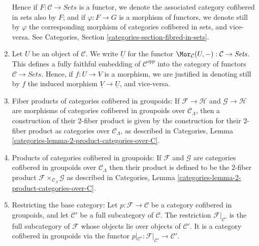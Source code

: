 \begin{remarks}
\begin{enumerate}
Hence if $F : \mathcal{C} \to \textit{Sets}$ is a functor, we denote the
associated category cofibered in sets also by $F$; and if
$\varphi : F \to G$ is a morphism of functors, we denote still by $\varphi$
the corresponding morphism of categories cofibered in sets, and vice-versa.
See Categories, Section \ref{categories-section-fibred-in-sets}.
\item
\label{item-definition-yoneda}
Let $U$ be an object of $\mathcal{C}$.  We write $\underline{U}$ for the
functor
$\Mor_\mathcal{C}(U, -): \mathcal{C} \to
\textit{Sets}$.  This defines a fully faithful embedding of $\mathcal
C^{opp}$ into the category of functors $\mathcal{C} \to
\textit{Sets}$. Hence, if $f : U \to V$ is a morphism, we are
justified in denoting still by $f$ the induced morphism $\underline{V}
\to \underline{U}$, and vice-versa.
\item
\label{item-fibre-product}
Fiber products of categories cofibered in groupoids: If $\mathcal{F}
\to \mathcal{H}$ and $\mathcal{G} \to \mathcal{H}$ are morphisms
of categories cofibered in groupoids over $\mathcal{C}_\Lambda$, then a
construction of their 2-fiber product is given by the construction for their
2-fiber product as categories over $\mathcal{C}_\Lambda$, as described in
Categories, Lemma \ref{categories-lemma-2-product-categories-over-C}.
\item
\label{item-product}
Products of categories cofibered in groupoids: If $\mathcal{F}$ and
$\mathcal{G}$ are categories cofibered in groupoids over
$\mathcal{C}_\Lambda$ then their product is defined to be the $2$-fiber product
$\mathcal{F} \times_{\mathcal{C}_\Lambda} \mathcal{G}$ as described in
Categories, Lemma \ref{categories-lemma-2-product-categories-over-C}.
\item
\label{item-definition-restricting-base-category}
Restricting the base category: Let $p : \mathcal{F} \to \mathcal{C}$ be a
category cofibered in groupoids, and let $\mathcal{C}'$ be a full
subcategory of $\mathcal{C}$. The restriction $\mathcal{F}|_{\mathcal{C}'}$
is the full subcategory of $\mathcal{F}$ whose objects lie over
objects of $\mathcal{C}'$. It is a category cofibered in groupoids via
the functor
$p|_{\mathcal{C}'}: \mathcal{F}|_{\mathcal{C}'} \to \mathcal{C}'$.
\end{enumerate}
\end{remarks}









